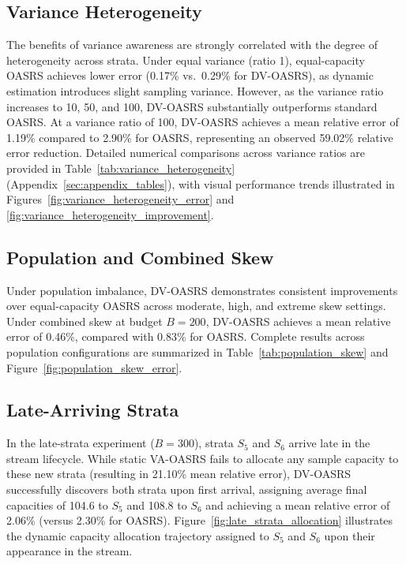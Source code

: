 \documentclass[conference]{IEEEtran}
\begin{document}
\subsection{Variance Heterogeneity}

The benefits of variance awareness are strongly correlated with the degree of heterogeneity across strata. Under equal variance (ratio 1), equal-capacity OASRS achieves lower error (0.17\% vs.\ 0.29\% for DV-OASRS), as dynamic estimation introduces slight sampling variance. However, as the variance ratio increases to 10, 50, and 100, DV-OASRS substantially outperforms standard OASRS. At a variance ratio of 100, DV-OASRS achieves a mean relative error of 1.19\% compared to 2.90\% for OASRS, representing an observed 59.02\% relative error reduction. Detailed numerical comparisons across variance ratios are provided in Table~\ref{tab:variance_heterogeneity} (Appendix~\ref{sec:appendix_tables}), with visual performance trends illustrated in Figures~\ref{fig:variance_heterogeneity_error} and \ref{fig:variance_heterogeneity_improvement}.

\subsection{Population and Combined Skew}

Under population imbalance, DV-OASRS demonstrates consistent improvements over equal-capacity OASRS across moderate, high, and extreme skew settings. Under combined skew at budget $B=200$, DV-OASRS achieves a mean relative error of 0.46\%, compared with 0.83\% for OASRS. Complete results across population configurations are summarized in Table~\ref{tab:population_skew} and Figure~\ref{fig:population_skew_error}.

\subsection{Late-Arriving Strata}

In the late-strata experiment ($B=300$), strata $S_5$ and $S_6$ arrive late in the stream lifecycle. While static VA-OASRS fails to allocate any sample capacity to these new strata (resulting in 21.10\% mean relative error), DV-OASRS successfully discovers both strata upon first arrival, assigning average final capacities of 104.6 to $S_5$ and 108.8 to $S_6$ and achieving a mean relative error of 2.06\% (versus 2.30\% for OASRS). Figure~\ref{fig:late_strata_allocation} illustrates the dynamic capacity allocation trajectory assigned to $S_5$ and $S_6$ upon their appearance in the stream.
\end{document}
